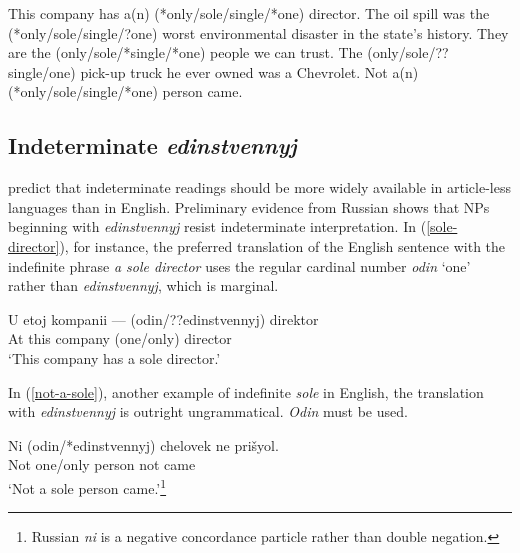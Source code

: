 \documentclass{article}
\begin{document}
\begin{exe}
	\ex \label{osso-indef} This company has a(n) (*only/sole/single/*one) director.
	\ex \label{osso-super} The oil spill was the (*only/sole/single/?one) worst environmental disaster in the state's history.
	\ex \label{osso-pl} They are the (only/sole/*single/*one) people we can trust.
	\ex \label{osso-npi} The (only/sole/??single/one) pick-up truck he ever owned was a Chevrolet.
	\ex \label{osso-dp-neg} Not a(n) (*only/sole/single/*one) person came.
\end{exe}

\subsection{Indeterminate \textit{edinstvennyj}}
\citet{cb2015} predict that indeterminate readings should be more widely available in article-less languages than in English. Preliminary evidence from Russian shows that NPs beginning with \textit{edinstvennyj} resist indeterminate interpretation. In (\ref{sole-director}), for instance, the preferred translation of the English sentence with the indefinite phrase \textit{a sole director} uses the regular cardinal number \textit{odin} `one' rather than \textit{edinstvennyj}, which is marginal.

\begin{exe}
	\ex \label{sole-director} \gll U etoj kompanii --- (odin/??edinstvennyj) direktor\\
	At this company {} (one/only) director\\
	\glt `This company has a sole director.'
\end{exe}


In (\ref{not-a-sole}), another example of indefinite \textit{sole} in English, the translation with \textit{edinstvennyj} is outright ungrammatical. \textit{Odin} must be used.

\begin{exe}
	\ex \label{not-a-sole} \gll Ni (odin/*edinstvennyj) chelovek ne pri\v{s}yol.\\
	Not one/only person not came\\
	\glt `Not a sole person came.'\footnote{Russian \textit{ni} is a negative concordance particle rather than double negation.}
\end{exe}
\end{document}
